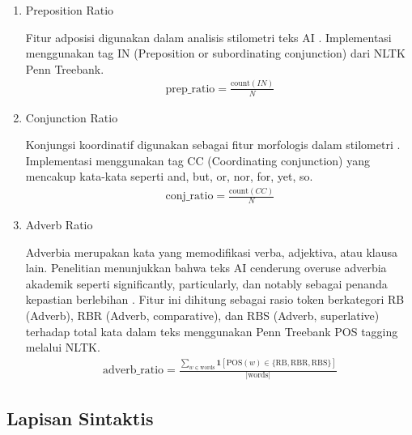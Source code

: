 \begin{enumerate}[label=\arabic*., leftmargin=*]
  \item Preposition Ratio
  
  Fitur adposisi digunakan dalam analisis stilometri teks AI \cite{Jaashan2025}. Implementasi menggunakan tag IN (Preposition or subordinating conjunction) dari NLTK Penn Treebank.
  \begin{equation}
  \label{eq:8}
  \begin{split}
\text{prep\_ratio}=\frac{\text{count}\left(IN\right)}{N}
  \end{split}
  \end{equation}

  \item Conjunction Ratio
  
  Konjungsi koordinatif digunakan sebagai fitur morfologis dalam stilometri \cite{Jaashan2025}. Implementasi menggunakan tag CC (Coordinating conjunction) yang mencakup kata-kata seperti and, but, or, nor, for, yet, so.
  \begin{equation}
  \label{eq:9}
  \begin{split}
\text{conj\_ratio}=\frac{\text{count}\left(CC\right)}{N}
  \end{split}
  \end{equation}

  \item Adverb Ratio
  
  Adverbia merupakan kata yang memodifikasi verba, adjektiva, atau klausa lain. Penelitian menunjukkan bahwa teks AI cenderung overuse adverbia akademik seperti significantly, particularly, dan notably sebagai penanda kepastian berlebihan \cite{Analysis}. Fitur ini dihitung sebagai rasio token berkategori RB (Adverb), RBR (Adverb, comparative), dan RBS (Adverb, superlative) terhadap total kata dalam teks menggunakan Penn Treebank POS tagging melalui NLTK.
  \begin{equation}
  \label{eq:10}
  \begin{split}
\text{adverb\_ratio} = \frac{\sum_{w \in \text{words}} \mathbf{1}\left[\text{POS}(w) \in \{\text{RB}, \text{RBR}, \text{RBS}\}\right]}{|\text{words}|}
  \end{split}
  \end{equation}

\end{enumerate}

\subsection{Lapisan Sintaktis}

